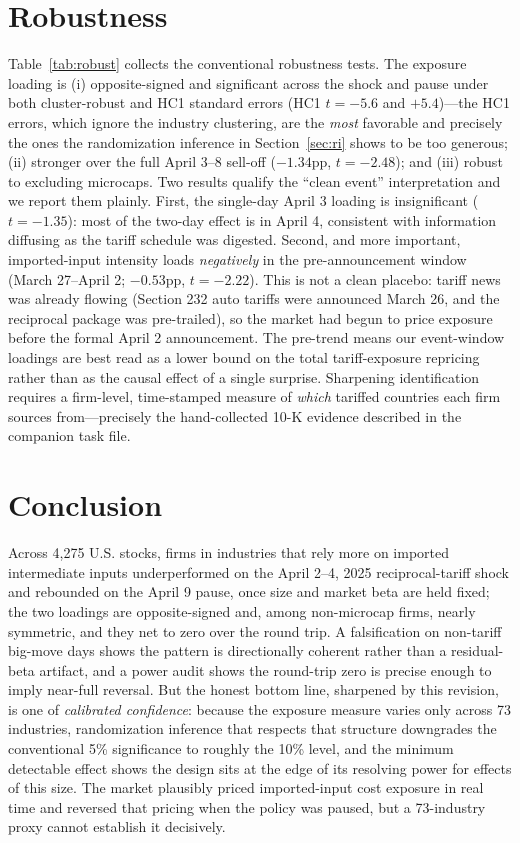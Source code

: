 \documentclass[12pt]{article}
\begin{document}
\section{Robustness}\label{sec:robust}
Table~\ref{tab:robust} collects the conventional robustness tests. The exposure loading is (i)
opposite-signed and significant across the shock and pause under both cluster-robust and
HC1 standard errors (HC1 $t=-5.6$ and $+5.4$)---the HC1 errors, which ignore the industry
clustering, are the \emph{most} favorable and precisely the ones the randomization inference
in Section~\ref{sec:ri} shows to be too generous; (ii) stronger over the full April 3--8
sell-off ($-1.34$pp, $t=-2.48$); and (iii) robust to excluding microcaps. Two results qualify
the ``clean event'' interpretation and we report them plainly. First, the single-day April 3
loading is insignificant ($t=-1.35$): most of the two-day effect is in April 4, consistent
with information diffusing as the tariff schedule was digested. Second, and more important,
imported-input intensity loads \emph{negatively} in the pre-announcement window (March
27--April 2; $-0.53$pp, $t=-2.22$). This is not a clean placebo: tariff news was already
flowing (Section 232 auto tariffs were announced March 26, and the reciprocal package was
pre-trailed), so the market had begun to price exposure before the formal April 2 announcement.
The pre-trend means our event-window loadings are best read as a lower bound on the total
tariff-exposure repricing rather than as the causal effect of a single surprise. Sharpening
identification requires a firm-level, time-stamped measure of \emph{which} tariffed countries
each firm sources from---precisely the hand-collected 10-K evidence described in the companion
task file.

\section{Conclusion}\label{sec:concl}
Across 4{,}275 U.S. stocks, firms in industries that rely more on imported intermediate
inputs underperformed on the April 2--4, 2025 reciprocal-tariff shock and rebounded on the
April 9 pause, once size and market beta are held fixed; the two loadings are opposite-signed
and, among non-microcap firms, nearly symmetric, and they net to zero over the round trip. A
falsification on non-tariff big-move days shows the pattern is directionally coherent rather
than a residual-beta artifact, and a power audit shows the round-trip zero is precise enough to
imply near-full reversal. But the honest bottom line, sharpened by this revision, is one of
\emph{calibrated confidence}: because the exposure measure varies only across 73 industries,
randomization inference that respects that structure downgrades the conventional 5\%
significance to roughly the 10\% level, and the minimum detectable effect shows the design sits
at the edge of its resolving power for effects of this size. The market plausibly priced
imported-input cost exposure in real time and reversed that pricing when the policy was paused,
but a 73-industry proxy cannot establish it decisively.
\end{document}
